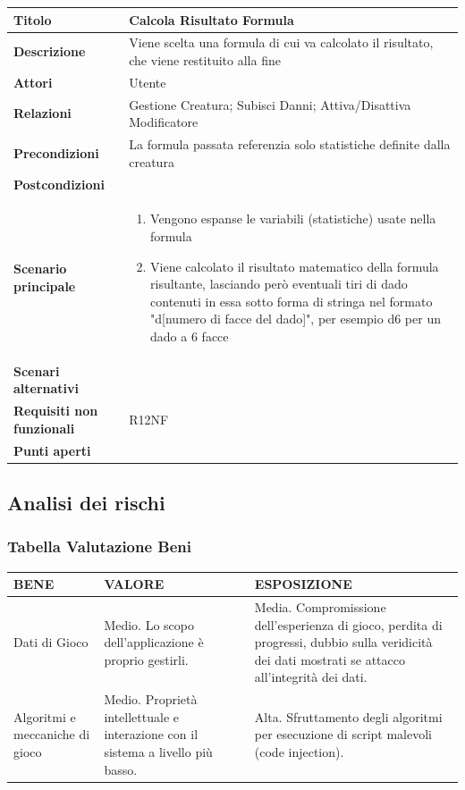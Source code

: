 \documentclass[a4paper, 11pt]{article}
\begin{document}
\begin{center}
\begin{tabular}{ |p{5cm}|p{9.5cm}|  }
\hline
\textbf{Titolo} & Calcola Risultato Formula \\
\hline
\textbf{Descrizione} & Viene scelta una formula di cui va calcolato il risultato, che viene restituito alla fine \\
\hline
\textbf{Attori} & Utente \\
\hline
\textbf{Relazioni} & Gestione Creatura; Subisci Danni; Attiva/Disattiva Modificatore \\
\hline
\textbf{Precondizioni} & La formula passata referenzia solo statistiche definite dalla creatura \\
\hline
\textbf{Postcondizioni} & \\
\hline
\textbf{Scenario principale} & 
\begin{enumerate}
    \item Vengono espanse le variabili (statistiche) usate nella formula
    \item Viene calcolato il risultato matematico della formula risultante, lasciando però eventuali tiri di dado contenuti in essa sotto forma di stringa nel formato "d[numero di facce del dado]", per esempio d6 per un dado a 6 facce
\end{enumerate}\\
\hline
\textbf{Scenari alternativi} &\\
\hline
\textbf{Requisiti non funzionali} & R12NF\\
\hline
\textbf{Punti aperti} & \\
\hline
\end{tabular}

\vspace{3em}

\end{center}

\newpage

\subsection{Analisi dei rischi}
\subsubsection*{Tabella Valutazione Beni}
\begin{center}
    \begin{tabular}{ |p{4cm}|p{5cm\RaggedRight}|p{4cm}|  }
        \hline
        \textbf{BENE} & \textbf{VALORE} & \textbf{ESPOSIZIONE} \\
        \hline
        Dati di Gioco & Medio. Lo scopo dell’applicazione è proprio gestirli. & Media. Compromissione dell’esperienza di gioco, perdita di progressi, dubbio sulla veridicità dei dati mostrati se attacco all’integrità dei dati. \\
        \hline
        Algoritmi e meccaniche di gioco & Medio. Proprietà intellettuale e interazione con il sistema a livello più basso. & Alta. Sfruttamento degli algoritmi per esecuzione di script malevoli (code injection). \\
        \hline
    \end{tabular}
\end{center}
\end{document}
